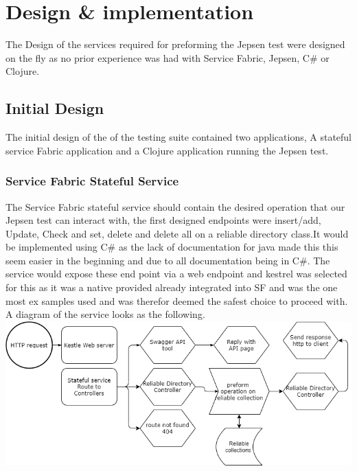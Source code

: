 \documentclass[a4paper,10pt,titlepage]{report}
\begin{document}
    \section{Design \& implementation}
    The Design of the services required for preforming the Jepsen test were designed on the fly as no prior experience was had with Service Fabric, Jepsen, C\# or Clojure.

    \subsection{Initial Design}

    The initial design of the of the testing suite contained two applications, A stateful service Fabric application and a Clojure application running the Jepsen test.

    \subsubsection{Service Fabric Stateful Service}

    The Service Fabric stateful service should contain the desired operation that our Jepsen test can interact with, the first designed endpoints were insert/add, Update, Check and set, delete and delete all on a reliable directory class.It would be implemented using C\# as the lack of documentation for java made this this seem easier in the beginning and due to all documentation being in C\#. The service would expose these end point via a web endpoint and kestrel was selected for this as it was a native provided already integrated into SF and was the one most ex samples used and was therefor deemed the safest choice to proceed with.\\
    \vspace{5mm}
    A diagram of the service looks as the following. \\
    \vspace{5mm}
    \includegraphics[scale=0.5]{images/Design_Stateful_service_1.0.drawio.png}
\end{document}
